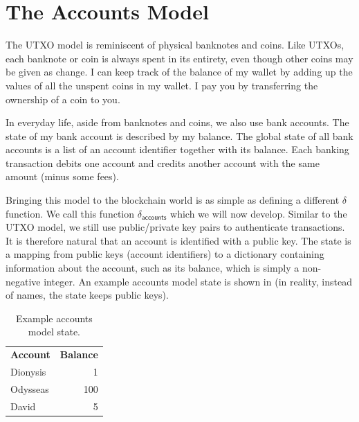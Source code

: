 \section{The Accounts Model}

The UTXO model is reminiscent of physical banknotes and coins. Like UTXOs, each banknote or
coin is always spent in its entirety, even though other coins may be given as
change. I can keep track of the balance of my wallet by adding up the values of
all the unspent coins in my wallet. I pay you by transferring the ownership of a
coin to you.

In everyday life, aside from banknotes and coins, we also use bank accounts.
The state of my bank account is described by my balance. The global state of all
bank accounts is a list of an account identifier together with its balance. Each banking
transaction debits one account and credits another account with the same amount
(minus some fees).

Bringing this model to the blockchain world is as simple as defining a different
$\delta$ function. We call this function $\delta_\textsf{accounts}$ which
we will now develop. Similar to the UTXO model, we still
use public/private key pairs to authenticate transactions. It is therefore natural
that an account is identified with a public key. The state is a mapping from public
keys (account identifiers) to a dictionary containing information about the account,
such as its balance, which is simply a non-negative integer. An example accounts model
state is shown in  (in reality, instead of names, the state keeps
public keys).

\begin{table}[htbp!]
    \centering
    \begin{tabular}{|l|r|}
    \hline
    \textbf{Account} & \multicolumn{1}{l|}{\textbf{Balance}} \\ \hhline{|=|=|}
    Dionysis         & 1                                     \\ \hline
    Odysseas         & 100                                   \\ \hline
    David            & 5                                     \\ \hline
    \end{tabular}
    \caption{Example accounts model state.}
    \label{tbl.balanceState}
\end{table}

